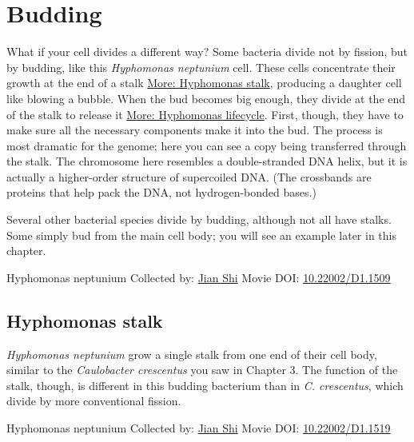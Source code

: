 \documentclass[]{tufte-book}
\begin{document}
\hypertarget{budding}{%
\section{Budding}\label{budding}}

What if your cell divides a different way? Some bacteria divide not by fission, but by budding, like this \emph{Hyphomonas neptunium} cell. These cells concentrate their growth at the end of a stalk \protect\hyperlink{Hyphomonas_stalk}{More: Hyphomonas stalk}, producing a daughter cell like blowing a bubble. When the bud becomes big enough, they divide at the end of the stalk to release it \protect\hyperlink{Hyphomonas_lifecycle}{More: Hyphomonas lifecycle}. First, though, they have to make sure all the necessary components make it into the bud. The process is most dramatic for the genome; here you can see a copy being transferred through the stalk. The chromosome here resembles a double-stranded DNA helix, but it is actually a higher-order structure of supercoiled DNA. (The crossbands are proteins that help pack the DNA, not hydrogen-bonded bases.)

Several other bacterial species divide by budding, although not all have stalks. Some simply bud from the main cell body; you will see an example later in this chapter.



\hypertarget{htmlwidget-a92d8b61a60322edcaf8}{}

\label{fig:5-3}Hyphomonas neptunium Collected by: \protect\hyperlink{jian_shi}{Jian Shi} Movie DOI: \href{https://doi.org/10.22002/D1.1509}{10.22002/D1.1509}

\hypertarget{Hyphomonas_stalk}{%
\subsection{Hyphomonas stalk}\label{Hyphomonas_stalk}}

\emph{Hyphomonas neptunium} grow a single stalk from one end of their cell body, similar to the \emph{Caulobacter crescentus} you saw in Chapter 3. The function of the stalk, though, is different in this budding bacterium than in \emph{C. crescentus}, which divide by more conventional fission.



\hypertarget{htmlwidget-3b9a9f9d3409745819b6}{}

\label{fig:5-3a}Hyphomonas neptunium Collected by: \protect\hyperlink{jian_shi}{Jian Shi} Movie DOI: \href{https://doi.org/10.22002/D1.1519}{10.22002/D1.1519}
\end{document}
